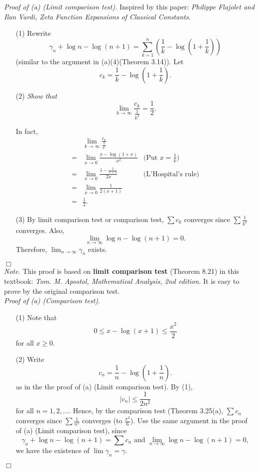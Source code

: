 \documentclass{article}
\begin{document}
\emph{Proof of (a) (Limit comparison test).}
Inspired by this paper:
\emph{Philippe Flajolet and Ilan Vardi,
Zeta Function Expansions of Classical Constants}.
\begin{enumerate}
\item[(1)]
Rewrite
\[
  \gamma_n + \log n - \log(n+1)
  = \sum_{k=1}^{n} \left( \frac{1}{k} - \log \left(1+\frac{1}{k}\right) \right)
\]
(similar to the argument in (a)(4)(Theorem 3.14)).
Let
\[
  c_k = \frac{1}{k} - \log \left(1+\frac{1}{k}\right).
\]
\item[(2)]
\emph{Show that
\[
  \lim_{k \to \infty}
  \frac{c_k}{ \frac{1}{k^2} }
  = \frac{1}{2}.
\]}

In fact,
\begin{align*}
  &\lim_{k \to \infty}
  \frac{c_k}{ \frac{1}{k^2} } \\
  =&
  \lim_{x \to 0} \frac{x - \log(1+x)}{ x^2 }
    &\text{(Put $x = \frac{1}{k}$)} \\
  =&
  \lim_{x \to 0} \frac{1 - \frac{1}{1+x}}{ 2x }
    &\text{(L'Hospital's rule)} \\
  =&
  \lim_{x \to 0} \frac{1}{ 2(x+1) } \\
  =& \frac{1}{2}.
\end{align*}
\item[(3)]
By limit comparison test or comparison test,
$\sum c_k$
converges since $\sum \frac{1}{k^2}$ converges.
Also, $$\lim_{n \to \infty} \log n - \log(n+1) = 0.$$
Therefore, $\lim_{n \to \infty} \gamma_n$ exists.
\end{enumerate}
$\Box$ \\

\emph{Note.}
This proof is based on \textbf{limit comparison test} (Theorem 8.21) in this textbook:
\emph{Tom. M. Apostol, Mathematical Analysis, 2nd edition.}
It is easy to prove by the original comparison test. \\



\emph{Proof of (a) (Comparison test).}
\begin{enumerate}
\item[(1)]
Note that
\[
  0 \leq x - \log(x+1) \leq \frac{x^2}{2}
\]
for all $x \geq 0$.

\item[(2)]
Write
\[
  c_n = \frac{1}{n} - \log \left(1+\frac{1}{n}\right).
\]
as in the the proof of (a) (Limit comparison test).
By (1),
\[
  |c_n| \leq \frac{1}{2n^2}
\]
for all $n=1,2,\ldots$.
Hence, by the comparison test (Theorem 3.25(a),
$\sum c_n$ converges since $\sum \frac{1}{n^2}$ converges (to $\frac{\pi^2}{6}$).
Use the same argument in the proof of (a) (Limit comparison test), since
\[
  \gamma_n + \log n - \log(n+1) = \sum c_n
  \text{ and }
  \lim_{n \to \infty} \log n - \log(n+1) = 0,
\]
we have the existence of $\lim \gamma_n = \gamma$.
\end{enumerate}
$\Box$ \\
\end{document}
